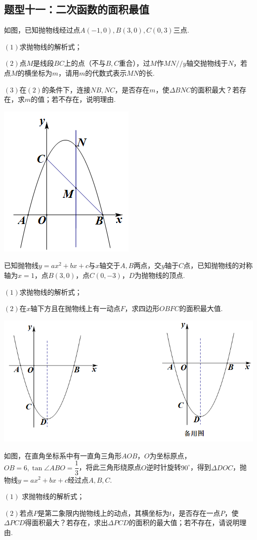 \documentclass[10pt]{ctexart}
\begin{document}
\subsection{题型十一：二次函数的面积最值}
\begin{dkyi}{}{}
  如图，已知抛物线经过点$A(-1,0),B(3,0),C(0,3)$三点.
  
  $(1)$求抛物线的解析式；
  
  $(2)$点$M$是线段$BC$上的点（不与$B,C$重合），过$M$作$MN//y$轴交抛物线于$N$，若点$M$的横坐标为$m$，请用$m$的代数式表示$MN$的长.
  
  $(3)$在$(2)$的条件下，连接$NB,NC$，是否存在$m$，使$\Delta BNC$的面积最大？若存在，求$m$的值；若不存在，说明理由.
\end{dkyi}
\raggedleft
\includegraphics[scale=0.6]{figure/l-28.PNG} 
\begin{dkyi}{}{}
   已知抛物线$y=ax^2+bx+c$与$x$轴交于$A,B$两点，交$y$轴于$C$点，已知抛物线的对称轴为$x=1$，点$B(3,0)$，点$C(0,-3)$，$D$为抛物线的顶点.
   
  $(1)$求抛物线的解析式；
  
  $(2)$在$x$轴下方且在抛物线上有一动点$F$，求四边形$OBFC$的面积最大值.
\end{dkyi}

\centering
\includegraphics[scale=0.6]{figure/l-29.PNG} 
\begin{jply}{}{}
如图，在直角坐标系中有一直角三角形$AOB$，$O$为坐标原点，$OB=6,\tan \angle ABO=\dfrac{1}{3}$，将此三角形绕原点$O$逆时针旋转$90^\circ$，得到$\Delta DOC$，抛物线$y=ax^2+bx+c$经过点$A,B,C$.
 
 $(1)$ 求抛物线的解析式；
 
$(2)$若点$P$是第二象限内抛物线上的动点，其横坐标为$t$，是否存在一点$P$，使$\Delta PCD$得面积最大？若存在，求出$\Delta PCD$的面积的最大值；若不存在，请说明理由.
\end{jply}
\end{document}
